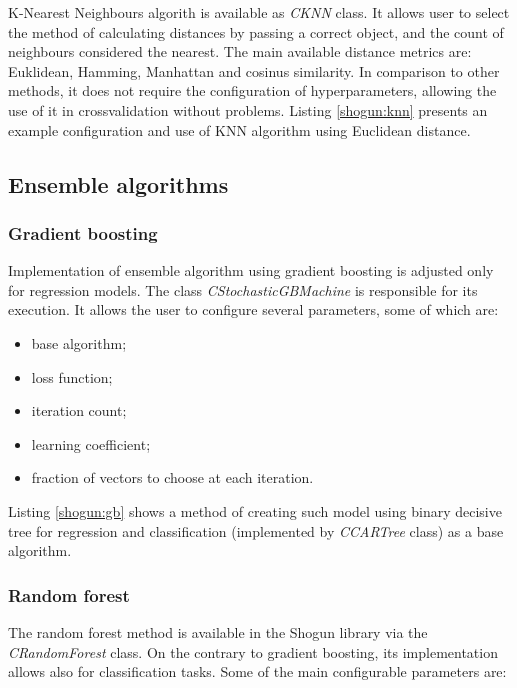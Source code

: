 K-Nearest Neighbours algorith is available as \textit{CKNN} class. It allows user to select the method of calculating distances by passing a correct object, and the count of neighbours considered the nearest. The main available distance metrics are: Euklidean, Hamming, Manhattan and cosinus similarity. In comparison to other methods, it does not require the configuration of hyperparameters, allowing the use of it in crossvalidation without problems. Listing \ref{shogun:knn} presents an example configuration and use of KNN algorithm using Euclidean distance.


\subsection{Ensemble algorithms}
\subsubsection{Gradient boosting}

Implementation of ensemble algorithm using gradient boosting is adjusted only for regression models. The class \textit{CStochasticGBMachine} is responsible for its execution. It allows the user to configure several parameters, some of which are:

\begin{itemize}
	\item base algorithm;
	\item loss function;
	\item iteration count;
	\item learning coefficient;
	\item fraction of vectors to choose at each iteration.
\end{itemize}

Listing \ref{shogun:gb} shows a method of creating such model using binary decisive tree for regression and classification (implemented by \textit{CCARTree} class) as a base algorithm.


\subsubsection{Random forest}
The random forest method is available in the Shogun library via the \textit{CRandomForest} class. On the contrary to gradient boosting, its implementation allows also for classification tasks. Some of the main configurable parameters are:

